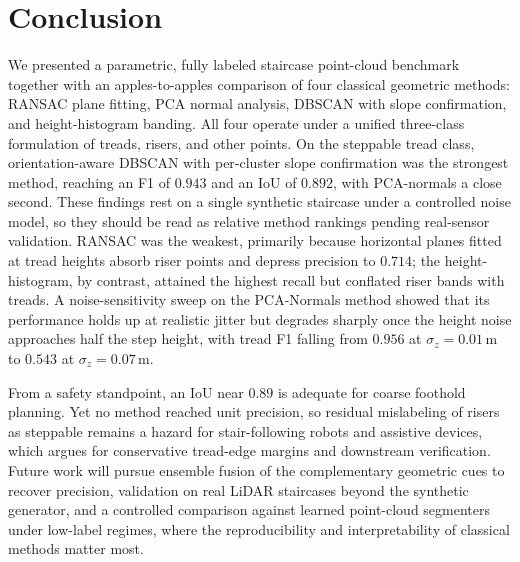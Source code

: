 \section{Conclusion}
\label{sec:conclusion}
We presented a parametric, fully labeled staircase point-cloud benchmark together with an apples-to-apples comparison of four classical geometric methods: RANSAC plane fitting, PCA normal analysis, DBSCAN with slope confirmation, and height-histogram banding. All four operate under a unified three-class formulation of treads, risers, and other points. On the steppable tread class, orientation-aware DBSCAN with per-cluster slope confirmation was the strongest method, reaching an F1 of $0.943$ and an IoU of $0.892$, with PCA-normals a close second. These findings rest on a single synthetic staircase under a controlled noise model, so they should be read as relative method rankings pending real-sensor validation. RANSAC was the weakest, primarily because horizontal planes fitted at tread heights absorb riser points and depress precision to $0.714$; the height-histogram, by contrast, attained the highest recall but conflated riser bands with treads. A noise-sensitivity sweep on the PCA-Normals method showed that its performance holds up at realistic jitter but degrades sharply once the height noise approaches half the step height, with tread F1 falling from $0.956$ at $\sigma_z=0.01$\,m to $0.543$ at $\sigma_z=0.07$\,m.

From a safety standpoint, an IoU near $0.89$ is adequate for coarse foothold planning. Yet no method reached unit precision, so residual mislabeling of risers as steppable remains a hazard for stair-following robots and assistive devices, which argues for conservative tread-edge margins and downstream verification. Future work will pursue ensemble fusion of the complementary geometric cues to recover precision, validation on real LiDAR staircases beyond the synthetic generator, and a controlled comparison against learned point-cloud segmenters \cite{qi2016pointnet,sarker2024comprehensive} under low-label regimes, where the reproducibility and interpretability of classical methods matter most.
